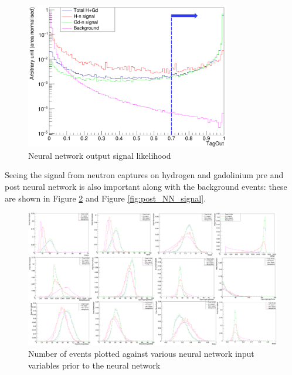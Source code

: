 \begin{figure}
    \centering
    \includegraphics[width=0.8\textwidth]{Figures/tagout.png}
    \caption{Neural network output signal likelihood }
    \label{fig:tagout}
\end{figure}


Seeing the signal from neutron captures on hydrogen and gadolinium pre and post neural network is also important along with the background events: these are shown in Figure \ref{fig:pre_NN_signal} and Figure \ref{fig:post_NN_signal}. 


\begin{landscape}
    \begin{figure}[t]
        \centering
        \hbox{\hspace{-0.5em}\includegraphics[width=\pdfpagewidth]{Figures/preNNvariablesbkg.PNG}}
        \caption{Number of events plotted against various neural network input variables prior to the neural network}
        \label{fig:pre_NN_signal}
    \end{figure}
\end{landscape}

